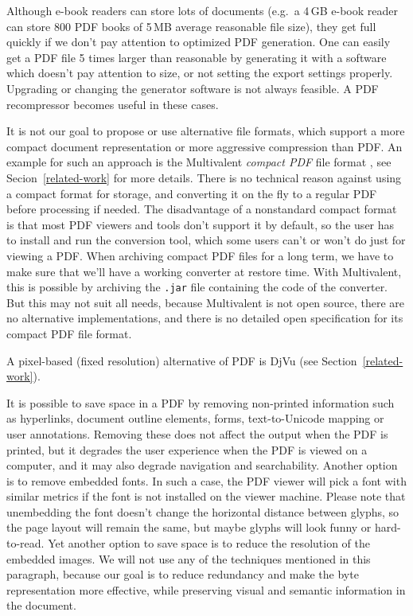 \documentclass{ltugproc}
\begin{document}
Although e-book readers can store lots of documents (e.g.\ a 4\,GB e-book
reader can store 800 PDF books of 5\,MB average reasonable file size), they
get full quickly if we don't pay attention to optimized PDF generation. One
can easily get a PDF file 5 times larger than reasonable by generating it
with a software which doesn't pay attention to size,
or not setting the export settings
properly. Upgrading or changing the generator software is not always
feasible. A PDF recompressor becomes useful in these cases.

It is not our goal to propose or use alternative file formats, which support
a more compact document representation or more aggressive compression than
PDF. An example for such an approach is the Multivalent \emph{compact PDF}
file format \cite{multivalent-compact}, see Secion~\ref{related-work} for
more details. There is no technical reason against using a compact format
for storage, and converting it on the fly to a regular PDF before processing
if needed. The disadvantage of a nonstandard compact format is that most PDF
viewers and tools don't support it by default, so the user has to install
and run the conversion tool, which some users can't or won't do just for
viewing a PDF. When archiving compact PDF files for a long term, we have to
make sure that we'll have a working converter at restore time. With
Multivalent, this is possible by archiving the \texttt{.jar} file containing
the code of the converter. But this may not suit all needs, because
Multivalent is not open source, there are no alternative implementations,
and there is no detailed open specification for its compact PDF file format.

A pixel-based (fixed resolution) alternative of PDF is DjVu (see
Section~\ref{related-work}).

It is possible to save space in a PDF by removing non-printed information
such as hyperlinks, document outline elements, forms, text-to-Unicode
mapping or user annotations. Removing these does not affect the output when
the PDF is printed, but it degrades the user experience when the PDF is
viewed on a computer, and it may also degrade navigation and searchability.
Another option is to remove embedded fonts. In such a case, the PDF viewer
will pick a font with similar metrics if the font is not installed on the
viewer machine. Please note that unembedding the font doesn't change the
horizontal distance between glyphs, so the page layout will remain the
same, but maybe glyphs will look funny or hard-to-read. Yet another option
to save space is to reduce the resolution of the embedded images. We will
not use any of the techniques mentioned in this paragraph, because our goal
is to reduce redundancy and make the byte representation more effective,
while preserving visual and semantic information in the document.
\end{document}
